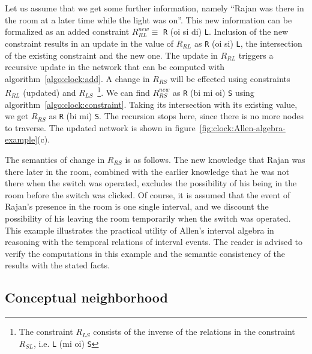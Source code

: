 Let us assume that we get some further information, namely ``Rajan was there in the room at a later time while the light was 
on''. This new information can be formalized as an added constraint $R^{new}_{RL} \equiv$ \texttt{R} (oi si di) \texttt{L}. Inclusion
of the new constraint results in an update in the value of $R_{RL}$ as \texttt{R} (oi si) \texttt{L}, the intersection of the 
existing constraint and the new one. The update in $R_{RL}$ triggers a recursive update in the network that can be computed with 
algorithm~\ref{algo:clock:add}. 
%
A change in $R_{RS}$ will be effected using constraints $R_{RL}$ (updated) and $R_{LS}$~\footnote{The constraint $R_{LS}$ consists of 
the inverse of the relations in the constraint $R_{SL}$, i.e. \texttt{L} (mi oi) \texttt{S}}. We can find $R^{new}_{RS}$ as \texttt{R} 
(bi mi oi) \texttt{S} using algorithm~\ref{algo:clock:constraint}. Taking its intersection with its existing value, we get $R_{RS}$ as 
\texttt{R} (bi mi) \texttt{S}. The recursion stops here, since there is no more nodes to traverse. 
The updated network is shown in figure~\ref{fig:clock:Allen-algebra-example}(c). 
 
The semantics of change in $R_{RS}$ is as follows. The new knowledge that Rajan was there later in the room, combined with
the earlier knowledge that he was not there when the switch was operated, excludes the possibility of his being in the room
before the switch was clicked. Of course, it is assumed that the event of Rajan's presence in the room is one single interval, 
and we discount the possibility of his leaving the room temporarily when the switch was operated.
This example illustrates the practical utility of Allen's interval algebra in reasoning with the temporal relations
of interval events. The reader is advised to verify the computations in this example and the semantic consistency of the 
results with the stated facts.

\subsection{Conceptual neighborhood}

